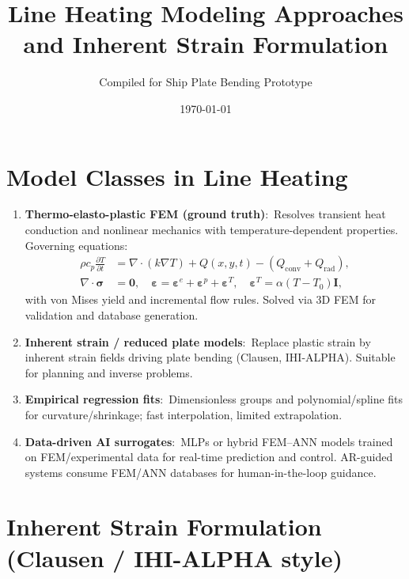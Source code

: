 \documentclass[11pt]{article}
\title{Line Heating Modeling Approaches and Inherent Strain Formulation}
\author{Compiled for Ship Plate Bending Prototype}
\date{\today}
\begin{document}
\maketitle

\section{Model Classes in Line Heating}
\begin{enumerate}
  \item \textbf{Thermo-elasto-plastic FEM (ground truth)}:\ Resolves transient heat conduction and nonlinear mechanics with temperature-dependent properties. Governing equations:
    \begin{align}
      \rho c_p \frac{\partial T}{\partial t} &= \nabla \cdot (k \nabla T) + Q(x,y,t) - (Q_{\text{conv}} + Q_{\text{rad}}), \\
      \nabla \cdot \boldsymbol\sigma &= \mathbf{0}, \quad \boldsymbol\varepsilon = \boldsymbol\varepsilon^e + \boldsymbol\varepsilon^p + \boldsymbol\varepsilon^T, \quad \boldsymbol\varepsilon^T = \alpha (T-T_0)\mathbf{I},
    \end{align}
    with von Mises yield and incremental flow rules. Solved via 3D FEM for validation and database generation.
  \item \textbf{Inherent strain / reduced plate models}:\ Replace plastic strain by inherent strain fields driving plate bending (Clausen, IHI-ALPHA). Suitable for planning and inverse problems.
  \item \textbf{Empirical regression fits}:\ Dimensionless groups and polynomial/spline fits for curvature/shrinkage; fast interpolation, limited extrapolation.
  \item \textbf{Data-driven AI surrogates}:\ MLPs or hybrid FEM--ANN models trained on FEM/experimental data for real-time prediction and control. AR-guided systems consume FEM/ANN databases for human-in-the-loop guidance.
\end{enumerate}

\section{Inherent Strain Formulation (Clausen / IHI-ALPHA style)}
\end{document}

